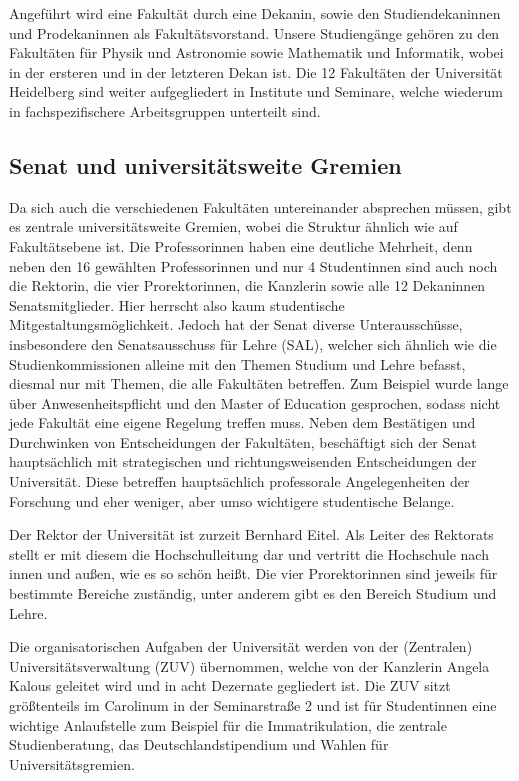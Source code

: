 Angeführt wird eine Fakultät durch eine Dekanin, sowie den Studiendekaninnen und Prodekaninnen als Fakultätsvorstand. Unsere Studiengänge gehören zu den Fakultäten für Physik und Astronomie sowie Mathematik und Informatik, wobei \dekanphysik in der ersteren und \dekanmathe in der letzteren Dekan ist. Die 12 Fakultäten der Universität Heidelberg sind weiter aufgegliedert in Institute und Seminare, welche wiederum in fachspezifischere Arbeitsgruppen unterteilt sind. 

\subsection{Senat und universitätsweite Gremien}
Da sich auch die verschiedenen Fakultäten untereinander absprechen müssen, gibt es zentrale universitätsweite Gremien, wobei die Struktur ähnlich wie auf Fakultätsebene ist. Die Professorinnen haben eine deutliche Mehrheit, denn neben den 16 gewählten Professorinnen und nur 4 Studentinnen sind auch noch die Rektorin, die vier Prorektorinnen, die Kanzlerin sowie alle 12 Dekaninnen Senatsmitglieder. Hier herrscht also kaum studentische Mitgestaltungsmöglichkeit. Jedoch hat der Senat diverse Unterausschüsse, insbesondere den Senatsausschuss für Lehre (SAL), welcher sich ähnlich wie die Studienkommissionen alleine mit den Themen Studium und Lehre befasst, diesmal nur mit Themen, die alle Fakultäten betreffen. Zum Beispiel wurde lange über Anwesenheitspflicht und den Master of Education gesprochen, sodass nicht jede Fakultät eine eigene Regelung treffen muss. Neben dem Bestätigen und Durchwinken von Entscheidungen der Fakultäten, beschäftigt sich der Senat hauptsächlich mit strategischen und richtungsweisenden Entscheidungen der Universität. 
Diese betreffen hauptsächlich professorale Angelegenheiten der Forschung und eher weniger, aber umso wichtigere studentische Belange. 

Der Rektor der Universität ist zurzeit Bernhard Eitel. Als Leiter des Rektorats stellt er mit diesem die Hochschulleitung dar und vertritt die Hochschule nach innen und außen, wie es so schön heißt. Die vier Prorektorinnen sind jeweils für bestimmte Bereiche zuständig, unter anderem gibt es den Bereich Studium und Lehre. 

Die organisatorischen Aufgaben der Universität werden von der (Zentralen) Universitätsverwaltung (ZUV) übernommen, welche von der Kanzlerin Angela Kalous geleitet wird und in acht Dezernate gegliedert ist. Die ZUV sitzt größtenteils im Carolinum in der Seminarstraße 2 und ist für Studentinnen eine wichtige Anlaufstelle zum Beispiel für die Immatrikulation, die zentrale Studienberatung, das Deutschlandstipendium und Wahlen für Universitätsgremien.

